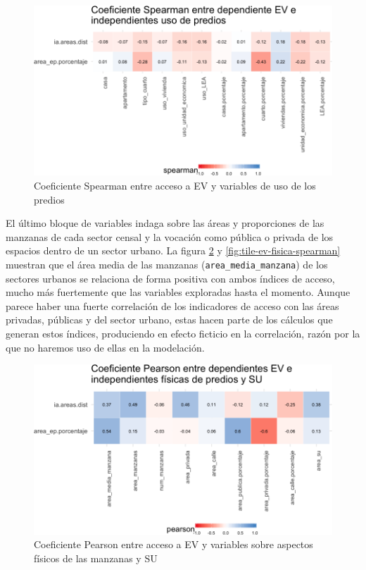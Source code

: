 \documentclass[12pt,]{book}
\begin{document}
\begin{figure}
\includegraphics[width=1\linewidth]{tesis-unigis_files/figure-latex/tile-ev-uso-spearman-1} \caption{Coeficiente Spearman entre acceso a EV y variables de uso de los predios}\label{fig:tile-ev-uso-spearman}
\end{figure}

El último bloque de variables indaga sobre las áreas y proporciones de
las manzanas de cada sector censal y la vocación como pública o privada
de los espacios dentro de un sector urbano. La figura
\ref{fig:tile-ev-fisica-pearson} y \ref{fig:tile-ev-fisica-spearman}
muestran que el área media de las manzanas
(\texttt{area\_media\_manzana}) de los sectores urbanos se relaciona de
forma positiva con ambos índices de acceso, mucho más fuertemente que
las variables exploradas hasta el momento. Aunque parece haber una
fuerte correlación de los indicadores de acceso con las áreas privadas,
públicas y del sector urbano, estas hacen parte de los cálculos que
generan estos índices, produciendo en efecto ficticio en la correlación,
razón por la que no haremos uso de ellas en la modelación.

\begin{figure}
\includegraphics[width=1\linewidth]{tesis-unigis_files/figure-latex/tile-ev-fisica-pearson-1} \caption{Coeficiente Pearson entre acceso a EV y variables sobre aspectos físicos de las manzanas y SU}\label{fig:tile-ev-fisica-pearson}
\end{figure}
\end{document}
